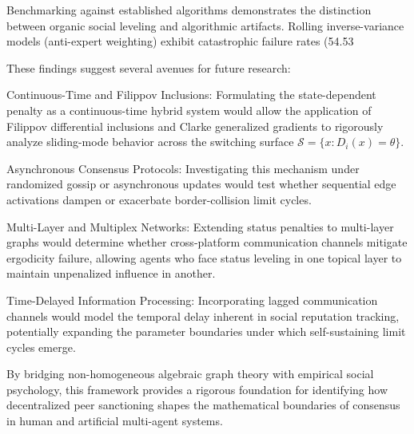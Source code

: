 Benchmarking against established algorithms demonstrates the distinction between organic social leveling and algorithmic artifacts\cite{degroot1974reaching}. Rolling inverse-variance models (anti-expert weighting) exhibit catastrophic failure rates (54.53%

These findings suggest several avenues for future research:

Continuous-Time and Filippov Inclusions: Formulating the state-dependent penalty as a continuous-time hybrid system would allow the application of Filippov differential inclusions and Clarke generalized gradients to rigorously analyze sliding-mode behavior across the switching surface $\mathcal{S} = \{x : D_i(x) = \theta\}$\cite{hajnal1958weak}.

Asynchronous Consensus Protocols: Investigating this mechanism under randomized gossip or asynchronous updates would test whether sequential edge activations dampen or exacerbate border-collision limit cycles\cite{acemoglu2013opinion,hajnal1958weak}.

Multi-Layer and Multiplex Networks: Extending status penalties to multi-layer graphs would determine whether cross-platform communication channels mitigate ergodicity failure, allowing agents who face status leveling in one topical layer to maintain unpenalized influence in another\cite{degroot1974reaching}.

Time-Delayed Information Processing: Incorporating lagged communication channels would model the temporal delay inherent in social reputation tracking, potentially expanding the parameter boundaries under which self-sustaining limit cycles emerge\cite{degroot1974reaching,hajnal1958weak}.

By bridging non-homogeneous algebraic graph theory with empirical social psychology, this framework provides a rigorous foundation for identifying how decentralized peer sanctioning shapes the mathematical boundaries of consensus in human and artificial multi-agent systems\cite{degroot1974reaching}.


